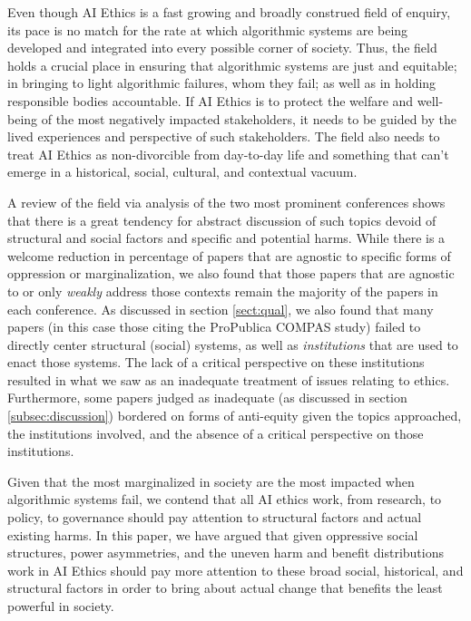 \documentclass[manuscript]{acmart}
\begin{document}
Even though AI Ethics is a fast growing and broadly construed  field of enquiry, its pace is no match for the rate at which algorithmic systems are being developed and integrated into every possible corner of society. %
Thus, the field holds a crucial place in ensuring that %
algorithmic systems are just and equitable; in bringing to light algorithmic failures, whom they fail; as well as in holding responsible bodies accountable. %
If AI Ethics is to protect the welfare and well-being of the most negatively impacted stakeholders, it needs to be guided by the lived experiences and perspective of such stakeholders. The field also needs to treat AI Ethics as non-divorcible from day-to-day life and something that can't emerge in a historical, social, cultural, and contextual vacuum. 

A review of the field via analysis of %
the two most prominent conferences shows that there is a great tendency for abstract discussion of such topics devoid of structural and social factors and specific and potential harms. While there is a welcome reduction in percentage of papers that are agnostic to specific forms of oppression or marginalization, we also found that those papers that are agnostic to or only \textit{weakly} address those contexts remain the majority of the papers in each conference. As discussed in section \ref{sect:qual}, we also found that many papers (in this case those citing the ProPublica COMPAS study) failed to directly center structural (social) systems, as well as \textit{institutions} that are used to enact those systems. The lack of a critical perspective on these institutions resulted in what we saw as an inadequate treatment of issues relating to ethics. %
Furthermore, some papers judged as inadequate (as discussed in section \ref{subsec:discussion}) bordered on forms of anti-equity given the topics approached, the institutions involved, and the absence of a critical perspective on those institutions. %

Given that the most marginalized in society are the most impacted when algorithmic systems fail, we contend that all AI ethics work, from research, to policy, to governance should pay attention to structural factors and actual existing harms. In this paper, we have argued that given oppressive social structures, power asymmetries, and the uneven harm and benefit distributions work in AI Ethics should pay more attention to these broad social, historical, and structural factors in order to bring about actual change that benefits the least powerful in society. 
\end{document}
